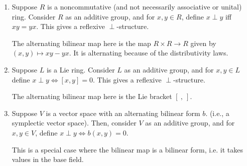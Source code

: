 \documentclass[a4paper]{amsart}
\begin{document}
\begin{enumerate}

\item Suppose $R$ is a noncommutative (and not necessarily
  associative or unital) ring. Consider $R$ as an additive group, and for
  $x,y\in R$, define $x \perp y$ iff $xy = yx$. This gives a reflexive
  $\perp$-structure.

  The alternating bilinear map here is the map $R \times R \to R$
  given by $(x,y) \mapsto xy - yx$. It is alternating because of the
  distributivity laws.

\item Suppose $L$ is a Lie ring. Consider $L$ as an additive group,
  and for $x,y \in L$ define $x \perp y \iff [x,y] = 0$. This gives a
  reflexive $\perp$-structure.

  The alternating bilinear map here is the Lie bracket $[ \ , \ ]$.

\item Suppose $V$ is a vector space with an alternating bilinear form $b$.
  (i.e., a symplectic vector space). Then, consider $V$ as an additive
  group, and for $x,y \in V$, define $x \perp y \iff b(x,y) = 0$.

  This is a special case where the bilinear map is a bilinear form,
  i.e. it takes values in the base field.
\end{enumerate}
\end{document}
